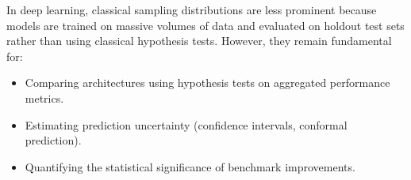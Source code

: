 \begin{observacion}
In deep learning, classical sampling distributions are less prominent because models are trained on massive volumes of data and evaluated on holdout test sets rather than using classical hypothesis tests. However, they remain fundamental for:
\begin{itemize}
 \item Comparing architectures using hypothesis tests on aggregated performance metrics.
 \item Estimating prediction uncertainty (confidence intervals, conformal prediction).
 \item Quantifying the statistical significance of benchmark improvements.
\end{itemize}
\end{observacion}

